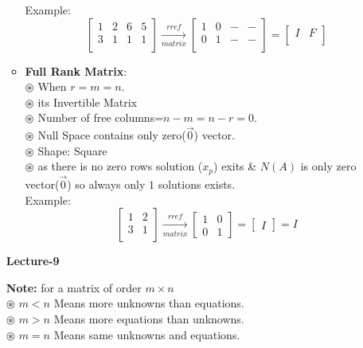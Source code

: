 \documentclass[a4paper,11pt]{article}
\numberwithin{equation}{section}
\begin{document}
\begin{itemize}
\begin{itemize}
    Example:
    \begin{equation}
        \begin{bmatrix}
            1&2&6&5\\3&1&1&1\\
        \end{bmatrix} \xrightarrow[matrix]{rref}
        \begin{bmatrix}
            1&0&-&-\\0&1&-&-\\
        \end{bmatrix}=
        \begin{bmatrix}
            I&F\\
        \end{bmatrix}
    \end{equation}
    \item \textbf{Full Rank Matrix}:\\
        \textbf{$\circledast$ }When $r=m=n$.\\
        \textbf{$\circledast$ }its Invertible Matrix\\
        \textbf{$\circledast$ }Number of free columns=$n-m=n-r=0$.\\
        \textbf{$\circledast$ }Null Space contains only zero($\vec{0}$) vector.\\
        \textbf{$\circledast$ }Shape: Square\\
        \textbf{$\circledast$ }as there is no zero rows solution ($x_p$) exits \& $N(A)$ is only zero vector($\vec{0}$) so always only $1$ solutions exists.\\

    Example:
    \begin{equation}
        \begin{bmatrix}
            1&2\\3&1\\
        \end{bmatrix} \xrightarrow[matrix]{rref}
        \begin{bmatrix}
            1&0\\0&1
        \end{bmatrix}=
        \begin{bmatrix}
            I
        \end{bmatrix}=I
    \end{equation}
\end{itemize}

\vspace{0.1cm}
\begin{center}
    \Huge{\textbf{Lecture-9}}
\end{center}
\vspace{5pt}
\textbf{Note: }for a matrix of order $m\times n$\\
    \textbf{$\circledast$ }$m<n$ Means more unknowns than equations.\\
    \textbf{$\circledast$ }$m>n$ Means more equations than unknowns.\\
    \textbf{$\circledast$ }$m=n$ Means same unknowns and equations.\\


\end{itemize}
\end{document}

